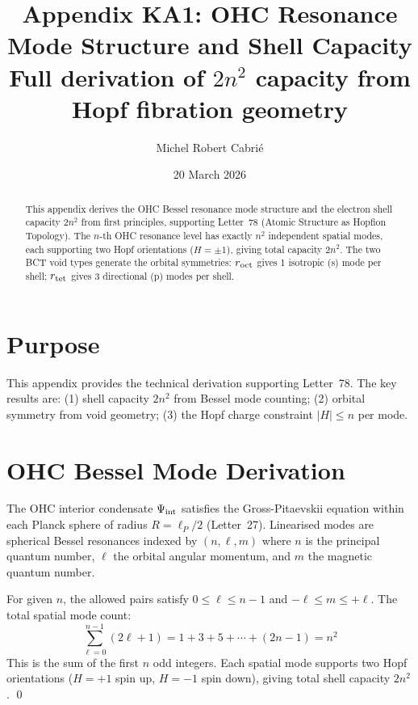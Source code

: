 \documentclass[aps,prl,twocolumn,showpacs,superscriptaddress]{revtex4-2}
\begin{document}
\title{Appendix KA1: OHC Resonance Mode Structure and Shell Capacity\\
Full derivation of $2n^2$ capacity from Hopf fibration geometry}

\author{Michel Robert Cabri\'e}
\date{20 March 2026}

\begin{abstract}
This appendix derives the OHC Bessel resonance mode structure and 
the electron shell capacity $2n^2$ from first principles, supporting 
Letter~78 (Atomic Structure as Hopfion Topology). The $n$-th OHC 
resonance level has exactly $n^2$ independent spatial modes, each 
supporting two Hopf orientations ($H=\pm1$), giving total capacity 
$2n^2$. The two BCT void types generate the orbital symmetries: 
$r_{\rm oct}$ gives 1 isotropic (s) mode per shell; $r_{\rm tet}$ 
gives 3 directional (p) modes per shell.
\end{abstract}

\maketitle

\section{Purpose}

This appendix provides the technical derivation supporting Letter~78.
The key results are: (1) shell capacity $2n^2$ from Bessel mode 
counting; (2) orbital symmetry from void geometry; (3) the Hopf 
charge constraint $|H|\leq n$ per mode.

\section{OHC Bessel Mode Derivation}

The OHC interior condensate $\Psi_{\rm int}$ satisfies the 
Gross-Pitaevskii equation within each Planck sphere of radius 
$R = \ell_P/2$ (Letter~27). Linearised modes are spherical Bessel 
resonances indexed by $(n, \ell, m)$ where $n$ is the principal 
quantum number, $\ell$ the orbital angular momentum, and $m$ the 
magnetic quantum number.

For given $n$, the allowed pairs satisfy $0\leq\ell\leq n-1$ and 
$-\ell\leq m\leq+\ell$. The total spatial mode count:
\begin{equation}
    \sum_{\ell=0}^{n-1}(2\ell+1) = 1+3+5+\cdots+(2n-1) = n^2
\end{equation}
This is the sum of the first $n$ odd integers. Each spatial mode 
supports two Hopf orientations ($H=+1$ spin up, $H=-1$ spin down), 
giving total shell capacity $2n^2$. \qed
\end{document}
